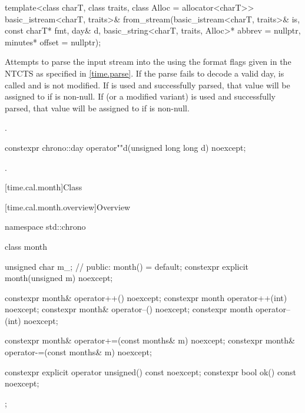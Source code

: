 %
\begin{itemdecl}
template<class charT, class traits, class Alloc = allocator<charT>>
  basic_istream<charT, traits>&
    from_stream(basic_istream<charT, traits>& is, const charT* fmt,
                day& d, basic_string<charT, traits, Alloc>* abbrev = nullptr,
                minutes* offset = nullptr);
\end{itemdecl}

\begin{itemdescr}
\pnum
\effects
Attempts to parse the input stream 
into the   using
the format flags given in the NTCTS 
as specified in \ref{time.parse}.
If the parse fails to decode a valid day,
 is called and
 is not modified.
If  is used and successfully parsed,
that value will be assigned to  if  is non-null.
If  (or a modified variant) is used and successfully parsed,
that value will be assigned to  if  is non-null.

\pnum
\returns
{}.
\end{itemdescr}

%
\begin{itemdecl}
constexpr chrono::day operator""d(unsigned long long d) noexcept;
\end{itemdecl}

\begin{itemdescr}
\pnum
\returns
{}.
\end{itemdescr}

[time.cal.month]{Class }

[time.cal.month.overview]{Overview}

\begin{codeblock}
namespace std::chrono {
  class month {
    unsigned char m_;           // \expos
  public:
    month() = default;
    constexpr explicit month(unsigned m) noexcept;

    constexpr month& operator++()    noexcept;
    constexpr month  operator++(int) noexcept;
    constexpr month& operator--()    noexcept;
    constexpr month  operator--(int) noexcept;

    constexpr month& operator+=(const months& m) noexcept;
    constexpr month& operator-=(const months& m) noexcept;

    constexpr explicit operator unsigned() const noexcept;
    constexpr bool ok() const noexcept;
  };
}
\end{codeblock}


